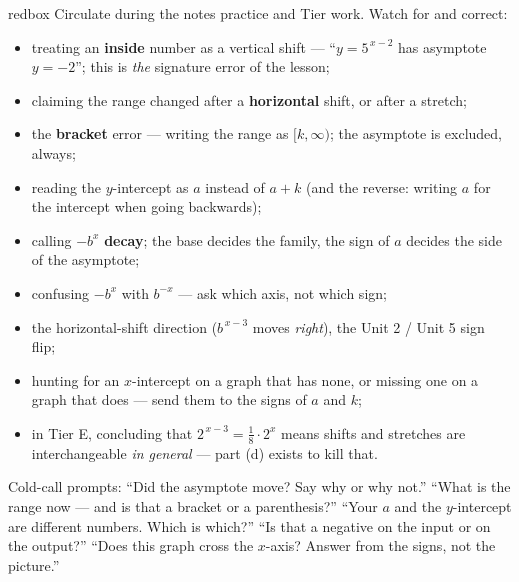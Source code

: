 \documentclass[10pt]{article}
\begin{document}
\begin{skillbox}{redbox}
Circulate during the notes practice and Tier work. Watch for and correct:
\begin{itemize}[leftmargin=1.2em, nosep]
  \item treating an \textbf{inside} number as a vertical shift --- ``$y=5^{\,x-2}$ has asymptote $y=-2$''; this is \emph{the} signature error of the lesson;
  \item claiming the range changed after a \textbf{horizontal} shift, or after a stretch;
  \item the \textbf{bracket} error --- writing the range as $[k,\infty)$; the asymptote is excluded, always;
  \item reading the $y$-intercept as $a$ instead of $a+k$ (and the reverse: writing $a$ for the intercept when going backwards);
  \item calling $-b^{x}$ \textbf{decay}; the base decides the family, the sign of $a$ decides the side of the asymptote;
  \item confusing $-b^{x}$ with $b^{-x}$ --- ask which axis, not which sign;
  \item the horizontal-shift direction ($b^{\,x-3}$ moves \emph{right}), the Unit 2 / Unit 5 sign flip;
  \item hunting for an $x$-intercept on a graph that has none, or missing one on a graph that does --- send them to the signs of $a$ and $k$;
  \item in Tier E, concluding that $2^{\,x-3}=\frac18\cdot2^{x}$ means shifts and stretches are interchangeable \emph{in general} --- part (d) exists to kill that.
\end{itemize}
Cold-call prompts: ``Did the asymptote move? Say why or why not.'' ``What is the range now --- and is
that a bracket or a parenthesis?'' ``Your $a$ and the $y$-intercept are different numbers. Which is
which?'' ``Is that a negative on the input or on the output?'' ``Does this graph cross the $x$-axis?
Answer from the signs, not the picture.''
\end{skillbox}
\end{document}
